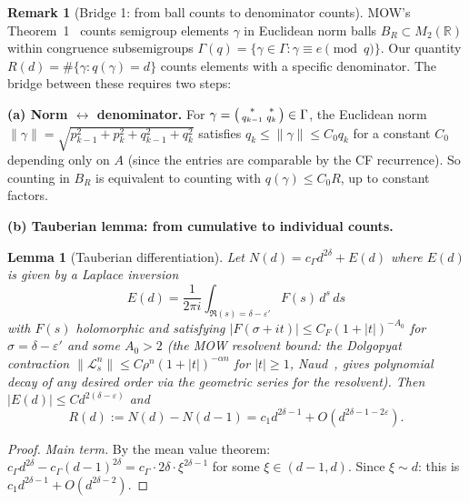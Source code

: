 \documentclass[11pt,a4paper]{amsart}
\newtheorem{lemma}[theorem]{Lemma}
\theoremstyle{definition}
\newtheorem{remark}[theorem]{Remark}
\begin{document}
\begin{remark}[Bridge 1: from ball counts to denominator counts]\label{rem:bridge1}
MOW's Theorem~1~\cite{MOW2019} counts semigroup elements $\gamma$ in Euclidean norm balls $B_R \subset M_2(\mathbb{R})$ within congruence subsemigroups $\Gamma(q) = \{\gamma \in \Gamma : \gamma \equiv e \pmod{q}\}$. Our quantity $R(d) = \#\{\gamma : q(\gamma) = d\}$ counts elements with a specific denominator. The bridge between these requires two steps:

\textbf{(a) Norm $\leftrightarrow$ denominator.} For $\gamma = \begin{psmallmatrix} * & * \\ q_{k-1} & q_k \end{psmallmatrix} \in \Gamma$, the Euclidean norm $\|\gamma\| = \sqrt{p_{k-1}^2 + p_k^2 + q_{k-1}^2 + q_k^2}$ satisfies $q_k \leq \|\gamma\| \leq C_0 q_k$ for a constant $C_0$ depending only on $A$ (since the entries are comparable by the CF recurrence). So counting in $B_R$ is equivalent to counting with $q(\gamma) \leq C_0 R$, up to constant factors.

\textbf{(b) Tauberian lemma: from cumulative to individual counts.}

\begin{lemma}[Tauberian differentiation]\label{lem:tauberian}
Let $N(d) = c_\Gamma d^{2\delta} + E(d)$ where $E(d)$ is given by a Laplace inversion
\begin{equation}\label{eq:laplace}
E(d) = \frac{1}{2\pi i} \int_{\Re(s) = \delta - \varepsilon'} F(s)\, d^s\, ds
\end{equation}
with $F(s)$ holomorphic and satisfying $|F(\sigma + it)| \leq C_F (1 + |t|)^{-A_0}$ for $\sigma = \delta - \varepsilon'$ and some $A_0 > 2$ (the MOW resolvent bound: the Dolgopyat contraction $\|\mathcal{L}_s^n\| \leq C\rho^n(1+|t|)^{-\alpha n}$ for $|t| \geq 1$, Naud~\cite{Naud2005}, gives polynomial decay of any desired order via the geometric series for the resolvent). Then $|E(d)| \leq C d^{2(\delta-\varepsilon)}$ and
\[
R(d) := N(d) - N(d-1) = c_1 d^{2\delta-1} + O(d^{2\delta-1-2\varepsilon}).
\]
\end{lemma}

\begin{proof}
\emph{Main term.} By the mean value theorem: $c_\Gamma d^{2\delta} - c_\Gamma(d-1)^{2\delta} = c_\Gamma \cdot 2\delta \cdot \xi^{2\delta-1}$ for some $\xi \in (d-1, d)$. Since $\xi \sim d$: this is $c_1 d^{2\delta-1} + O(d^{2\delta-2})$.


\end{proof}
\end{remark}
\end{document}
